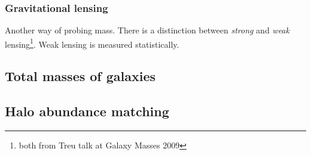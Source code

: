 \documentclass{article}
\begin{document}
\subsubsection{Gravitational lensing}
Another way of probing mass. There is a distinction between \textit{strong}
and \textit{weak} lensing\footnote{both from Treu talk at Galaxy Masses 2009}.
Weak lensing is measured statistically.

\subsection{Total masses of galaxies}
\subsection{Halo abundance matching}
\end{document}
